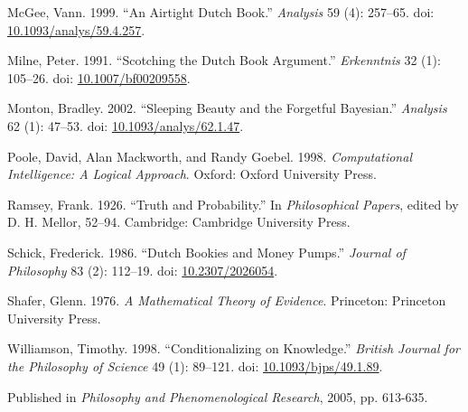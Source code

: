 \documentclass[
  11pt,
  letterpaper,
  DIV=11,
  numbers=noendperiod,
  twoside]{scrartcl}
\newlength{\cslhangindent}
\newenvironment{CSLReferences}[2] %
 {\begin{list}{}{%
  \setlength{\itemindent}{0pt}
  \setlength{\leftmargin}{0pt}
  \setlength{\parsep}{0pt}
  \ifodd #1
   \setlength{\leftmargin}{\cslhangindent}
   \setlength{\itemindent}{-1\cslhangindent}
  \fi
  \setlength{\itemsep}{#2\baselineskip}}}
 {\end{list}}
\begin{document}
\begin{CSLReferences}{1}{0}
McGee, Vann. 1999. {``An Airtight Dutch Book.''} \emph{Analysis} 59 (4):
257--65. doi:
\href{https://doi.org/10.1093/analys/59.4.257}{10.1093/analys/59.4.257}.

Milne, Peter. 1991. {``Scotching the Dutch Book Argument.''}
\emph{Erkenntnis} 32 (1): 105--26. doi:
\href{https://doi.org/10.1007/bf00209558}{10.1007/bf00209558}.

Monton, Bradley. 2002. {``Sleeping Beauty and the Forgetful Bayesian.''}
\emph{Analysis} 62 (1): 47--53. doi:
\href{https://doi.org/10.1093/analys/62.1.47}{10.1093/analys/62.1.47}.

Poole, David, Alan Mackworth, and Randy Goebel. 1998.
\emph{Computational Intelligence: A Logical Approach}. Oxford: Oxford
University Press.

Ramsey, Frank. 1926. {``Truth and Probability.''} In \emph{Philosophical
Papers}, edited by D. H. Mellor, 52--94. Cambridge: Cambridge University
Press.

Schick, Frederick. 1986. {``Dutch Bookies and Money Pumps.''}
\emph{Journal of Philosophy} 83 (2): 112--19. doi:
\href{https://doi.org/10.2307/2026054}{10.2307/2026054}.

Shafer, Glenn. 1976. \emph{A Mathematical Theory of Evidence}.
Princeton: Princeton University Press.

Williamson, Timothy. 1998. {``{Conditionalizing on Knowledge}.''}
\emph{British Journal for the Philosophy of Science} 49 (1): 89--121.
doi: \href{https://doi.org/10.1093/bjps/49.1.89}{10.1093/bjps/49.1.89}.

\end{CSLReferences}



\noindent Published in\emph{
Philosophy and Phenomenological Research}, 2005, pp. 613-635.
\end{document}
